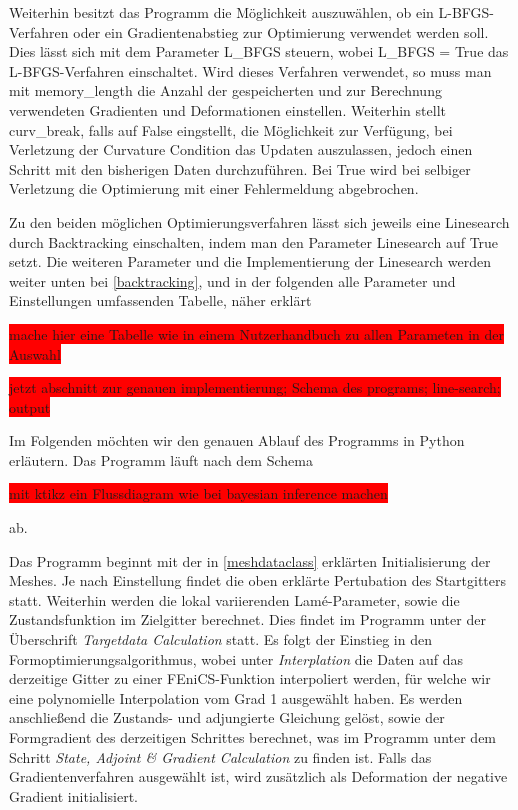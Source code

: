 Weiterhin besitzt das Programm die Möglichkeit auszuwählen, ob ein L-BFGS-Verfahren oder ein Gradientenabstieg zur Optimierung verwendet werden soll. Dies lässt sich mit dem Parameter \textsf{L\_BFGS} steuern, wobei \textsf{L\_BFGS = True} das L-BFGS-Verfahren einschaltet. Wird dieses Verfahren verwendet, so muss man mit \textsf{memory\_length} die Anzahl der gespeicherten und zur Berechnung verwendeten Gradienten und Deformationen einstellen. Weiterhin stellt \textsf{curv\_break}, falls auf \textsf{False} eingstellt, die Möglichkeit zur Verfügung, bei Verletzung der Curvature Condition das Updaten auszulassen, jedoch einen Schritt mit den bisherigen Daten durchzuführen. Bei \textsf{True} wird bei selbiger Verletzung die Optimierung mit einer Fehlermeldung abgebrochen.

Zu den beiden möglichen Optimierungsverfahren lässt sich jeweils eine Linesearch durch Backtracking einschalten, indem man den Parameter \textsf{Linesearch} auf \textsf{True} setzt. Die weiteren Parameter und die Implementierung der Linesearch werden weiter unten bei \ref{backtracking}, und in der folgenden alle Parameter und Einstellungen umfassenden Tabelle, näher erklärt

\colorbox{red}{mache hier eine Tabelle wie in einem Nutzerhandbuch zu allen Parameten in der Auswahl}


\colorbox{red}{jetzt abschnitt zur genauen implementierung; Schema des programs; line-search; output}

Im Folgenden möchten wir den genauen Ablauf des Programms in Python erläutern. 
Das Programm läuft nach dem Schema

\colorbox{red}{mit ktikz ein Flussdiagram wie bei bayesian inference machen}


ab. 

Das Programm beginnt mit der in \ref{meshdataclass} erklärten Initialisierung der Meshes. Je nach Einstellung findet die oben erklärte Pertubation des Startgitters statt. Weiterhin werden die lokal variierenden Lamé-Parameter, sowie die Zustandsfunktion im Zielgitter berechnet. Dies findet im Programm unter der Überschrift \textit{Targetdata Calculation} statt. Es folgt der Einstieg in den Formoptimierungsalgorithmus, wobei unter \textit{Interplation} die Daten auf das derzeitige Gitter zu einer FEniCS-Funktion interpoliert werden, für welche wir eine polynomielle Interpolation vom Grad 1 ausgewählt haben. Es werden anschließend die Zustands- und adjungierte Gleichung gelöst, sowie der Formgradient des derzeitigen Schrittes berechnet, was im Programm unter dem Schritt \textit{State, Adjoint \& Gradient Calculation} zu finden ist. Falls das Gradientenverfahren ausgewählt ist, wird zusätzlich als Deformation der negative Gradient initialisiert. 


